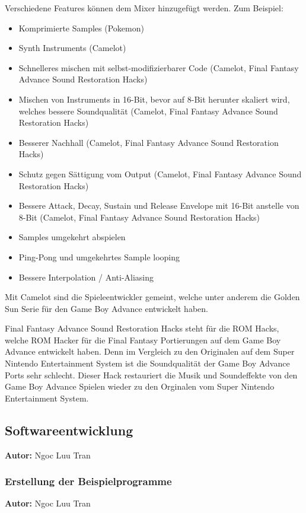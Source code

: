 \documentclass[11pt,a4paper]{scrartcl}
\newcommand{\AutorNgoc} {
    \vspace{-4mm}
    \large \textbf{Autor:} Ngoc Luu Tran \normalsize
    \vspace{2mm}
}
\begin{document}
Verschiedene Features k\"onnen dem Mixer hinzugef\"ugt werden. Zum Beispiel:
\begin{itemize}
\item Komprimierte Samples (Pokemon)
\item Synth Instruments (Camelot)
\item Schnelleres mischen mit selbst-modifizierbarer Code (Camelot, Final Fantasy Advance Sound Restoration Hacks)
\item Mischen von Instruments in 16-Bit, bevor auf 8-Bit herunter skaliert wird, welches bessere Soundqualit\"at (Camelot, Final Fantasy Advance Sound Restoration Hacks)
\item Besserer Nachhall (Camelot, Final Fantasy Advance Sound Restoration Hacks)
\item Schutz gegen S\"attigung vom Output (Camelot, Final Fantasy Advance Sound Restoration Hacks)
\item Bessere Attack, Decay, Sustain und Release Envelope mit 16-Bit anstelle von 8-Bit (Camelot, Final Fantasy Advance Sound Restoration Hacks)
\item Samples umgekehrt abspielen
\item Ping-Pong und umgekehrtes Sample looping
\item Bessere Interpolation / Anti-Aliasing
\end{itemize}

Mit Camelot sind die Spieleentwickler gemeint, welche unter anderem die Golden Sun Serie f\"ur den Game Boy Advance entwickelt haben. 

Final Fantasy Advance Sound Restoration Hacks steht f\"ur die ROM Hacks, welche ROM Hacker f\"ur die Final Fantasy Portierungen auf dem Game Boy Advance entwickelt haben. Denn im Vergleich zu den Originalen auf dem Super Nintendo Entertainment System ist die Soundqualit\"at der Game Boy Advance Ports sehr schlecht. Dieser Hack restauriert die Musik und Soundeffekte von den Game Boy Advance Spielen wieder zu den Orginalen vom Super Nintendo Entertainment System.



\subsection{Softwareentwicklung} \label{Softwareentwicklung}
\AutorNgoc

\subsubsection{Erstellung der Beispielprogramme}
\AutorNgoc
\end{document}
